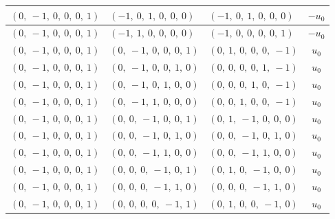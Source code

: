 \documentclass[11pt]{article}
\theoremstyle{definition}
\begin{document}
\begin{longtable}{|l|l|l|c|}
    \hline
    $\left( 0, \  -1, \  0, \  0, \  0, \  1\right)$ & $\left( -1, \  0, \  1, \  0, \  0, \  0\right)$ & $\left( -1, \  0, \  1, \  0, \  0, \  0\right)$ & $- u_{0}$ \\
    \hline
    $\left( 0, \  -1, \  0, \  0, \  0, \  1\right)$ & $\left( -1, \  1, \  0, \  0, \  0, \  0\right)$ & $\left( -1, \  0, \  0, \  0, \  0, \  1\right)$ & $- u_{0}$ \\
    \hline
    $\left( 0, \  -1, \  0, \  0, \  0, \  1\right)$ & $\left( 0, \  -1, \  0, \  0, \  0, \  1\right)$ & $\left( 0, \  1, \  0, \  0, \  0, \  -1\right)$ & $u_{0}$ \\
    \hline
    $\left( 0, \  -1, \  0, \  0, \  0, \  1\right)$ & $\left( 0, \  -1, \  0, \  0, \  1, \  0\right)$ & $\left( 0, \  0, \  0, \  0, \  1, \  -1\right)$ & $u_{0}$ \\
    \hline
    $\left( 0, \  -1, \  0, \  0, \  0, \  1\right)$ & $\left( 0, \  -1, \  0, \  1, \  0, \  0\right)$ & $\left( 0, \  0, \  0, \  1, \  0, \  -1\right)$ & $u_{0}$ \\
    \hline
    $\left( 0, \  -1, \  0, \  0, \  0, \  1\right)$ & $\left( 0, \  -1, \  1, \  0, \  0, \  0\right)$ & $\left( 0, \  0, \  1, \  0, \  0, \  -1\right)$ & $u_{0}$ \\
    \hline
    $\left( 0, \  -1, \  0, \  0, \  0, \  1\right)$ & $\left( 0, \  0, \  -1, \  0, \  0, \  1\right)$ & $\left( 0, \  1, \  -1, \  0, \  0, \  0\right)$ & $u_{0}$ \\
    \hline
    $\left( 0, \  -1, \  0, \  0, \  0, \  1\right)$ & $\left( 0, \  0, \  -1, \  0, \  1, \  0\right)$ & $\left( 0, \  0, \  -1, \  0, \  1, \  0\right)$ & $u_{0}$ \\
    \hline
    $\left( 0, \  -1, \  0, \  0, \  0, \  1\right)$ & $\left( 0, \  0, \  -1, \  1, \  0, \  0\right)$ & $\left( 0, \  0, \  -1, \  1, \  0, \  0\right)$ & $u_{0}$ \\
    \hline
    $\left( 0, \  -1, \  0, \  0, \  0, \  1\right)$ & $\left( 0, \  0, \  0, \  -1, \  0, \  1\right)$ & $\left( 0, \  1, \  0, \  -1, \  0, \  0\right)$ & $u_{0}$ \\
    \hline
    $\left( 0, \  -1, \  0, \  0, \  0, \  1\right)$ & $\left( 0, \  0, \  0, \  -1, \  1, \  0\right)$ & $\left( 0, \  0, \  0, \  -1, \  1, \  0\right)$ & $u_{0}$ \\
    \hline
    $\left( 0, \  -1, \  0, \  0, \  0, \  1\right)$ & $\left( 0, \  0, \  0, \  0, \  -1, \  1\right)$ & $\left( 0, \  1, \  0, \  0, \  -1, \  0\right)$ & $u_{0}$ \\

\end{longtable}
\end{document}
